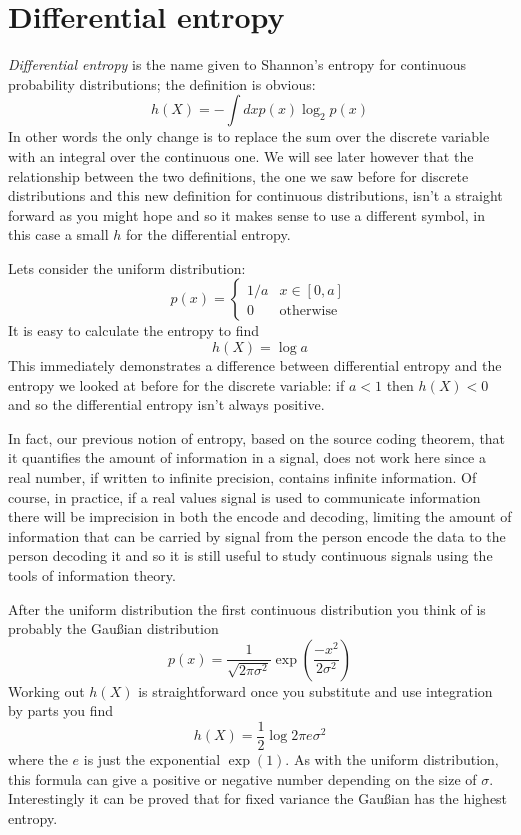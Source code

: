 \documentclass[12pt]{article}
\begin{document}
\section*{Differential entropy} 

\textsl{Differential entropy} is the name given to Shannon's entropy for continuous probability distributions; the definition is obvious:
\begin{equation}
  h(X)=-\int dx p(x)\log_2{p(x)}
\end{equation}
In other words the only change is to replace the sum over the discrete
variable with an integral over the continuous one. We will see later
however that the relationship between the two definitions, the one we
saw before for discrete distributions and this new definition for
continuous distributions, isn't a straight forward as you might hope
and so it makes sense to use a different symbol, in this case a small
$h$ for the differential entropy.

Lets consider the uniform distribution:
\begin{equation}
  p(x)=\left\{\begin{array}{ll}1/a&x\in [0,a]\\0&\mbox{otherwise}\end{array}\right.
\end{equation}
It is easy to calculate the entropy to find
\begin{equation}
  h(X)=\log{a}
\end{equation}
This immediately demonstrates a difference between differential
entropy and the entropy we looked at before for the discrete variable:
if $a<1$ then $h(X)<0$ and so the differential entropy isn't always
positive.

In fact, our previous notion of entropy, based on the source coding
theorem, that it quantifies the amount of information in a signal,
does not work here since a real number, if written to infinite
precision, contains infinite information. Of course, in practice, if a
real values signal is used to communicate information there will be
imprecision in both the encode and decoding, limiting the amount of
information that can be carried by signal from the person encode the
data to the person decoding it and so it is still useful to study
continuous signals using the tools of information theory.

After the uniform distribution the first continuous distribution you
think of is probably the Gau{\ss}ian distribution
\begin{equation}
  p(x)=\frac{1}{\sqrt{2\pi \sigma^2}}\exp\left(\frac{-x^2}{2\sigma^2}\right)
\end{equation}
Working out $h(X)$ is straightforward once you substitute and use integration by parts you find
\begin{equation}
  h(X)=\frac{1}{2}\log{2\pi e \sigma^2}
\end{equation}
where the $e$ is just the exponential $\exp{(1)}$. As with the uniform
distribution, this formula can give a positive or negative number
depending on the size of $\sigma$. Interestingly it can be proved that
for fixed variance the Gau{\ss}ian has the highest entropy.
\end{document}
